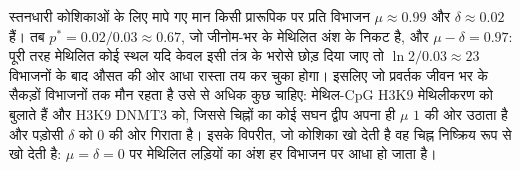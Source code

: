 \begin{example}[संख्याएँ]\label{ex:b3:chromatin-epigenetics:maintenance-numbers}
स्तनधारी कोशिकाओं के लिए मापे गए मान किसी प्रारूपिक  पर प्रति विभाजन
$\mu \approx 0.99$ और $\delta \approx 0.02$ हैं। तब $p^{*} =
0.02/0.03 \approx 0.67$, जो जीनोम-भर के मेथिलित अंश के निकट है, और
$\mu - \delta = 0.97$: पूरी तरह मेथिलित कोई स्थल यदि केवल इसी तंत्र के
भरोसे छोड़ दिया जाए तो $\ln 2 /
0.03 \approx 23$ विभाजनों के बाद औसत की ओर आधा रास्ता तय कर चुका
होगा। इसलिए जो प्रवर्तक जीवन भर के सैकड़ों विभाजनों तक मौन रहता है उसे
 से अधिक कुछ चाहिए: मेथिल-CpG  H3K9 मेथिलीकरण को बुलाते हैं
और H3K9  DNMT3 को, जिससे चिह्नों का कोई सघन द्वीप अपना ही $\mu$
$1$ की ओर उठाता है और पड़ोसी $\delta$ को $0$ की ओर गिराता है। इसके
विपरीत, जो कोशिका  खो देती है वह चिह्न निष्क्रिय रूप से खो देती
है: $\mu = \delta = 0$ पर मेथिलित लड़ियों का अंश हर विभाजन पर आधा हो
जाता है।
\end{example}

